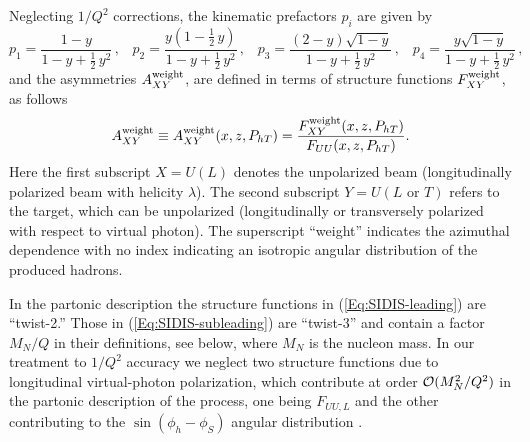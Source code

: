 \documentclass[a4paper,11pt]{article}
\newcommand{\be}{\begin{equation}}
\newcommand{\ee}{\end{equation}}
\newcommand{\ba}{\begin{eqnarray}}
\newcommand{\ea}{\end{eqnarray}}
\newcommand{\slim}{\mskip 1.5mu}       %
\def\Phperp{P_{hT}}
\begin{document}
Neglecting $1/Q^2$ corrections, the kinematic prefactors $p_i$ are given by
\be\label{Eq:y-prefactors}
	p_1 = \frac{1-y}{1-y+\frac12\,y^2} 		\, , \;\;\;
	p_2 = \frac{y(1-\frac12\,y)}{1-y+\frac12\,y^2}	\, , \;\;\;
	p_3 = \frac{(2-y)\sqrt{1-y}}{1-y+\frac12\,y^2} 	\, , \;\;\;
	p_4 = \frac{y\sqrt{1-y}}{1-y+\frac12\,y^2}     	\, ,
\ee
and the asymmetries {$A_{XY}^{\rm weight}$,  are defined in terms of
structure functions $F_{XY}^{\rm weight}$, as follows}
\be
	A_{XY}^{\rm weight}\equiv A_{XY}^{\rm weight}(x,z,\Phperp)=
	\frac{F_{XY}^{\rm weight}(x,z,\Phperp)}{F_{UU}(x,z,\Phperp)}.
\ee
Here the first subscript $X=U(L)$ denotes the unpolarized beam
(longitudinally polarized beam with helicity $\lambda$). The second
subscript $Y=U(L\text{ or }T)$ refers to the target, which can be unpolarized
(longitudinally or transversely polarized with respect to virtual photon).
The superscript ``weight'' indicates the azimuthal dependence with no index
indicating an isotropic angular distribution of the produced hadrons.

In the partonic description the structure functions in
(\ref{Eq:SIDIS-leading})    are ``twist-2.'' Those in
(\ref{Eq:SIDIS-subleading}) are ``twist-3'' and contain a
factor $M_N/Q$ in their definitions, see below,
where $M_N$ is the nucleon mass. In our treatment to $1/Q^2$
accuracy we neglect two structure functions due to longitudinal virtual-photon
polarization, which contribute at order ${\cal O}(M_N^2/Q^2)$ in the
partonic description of the process, one being $F_{UU,L}$ and the other
contributing to the $\sin(\phi_h-\phi_S)$ angular distribution
\cite{Bacchetta:2006tn}.
\end{document}
